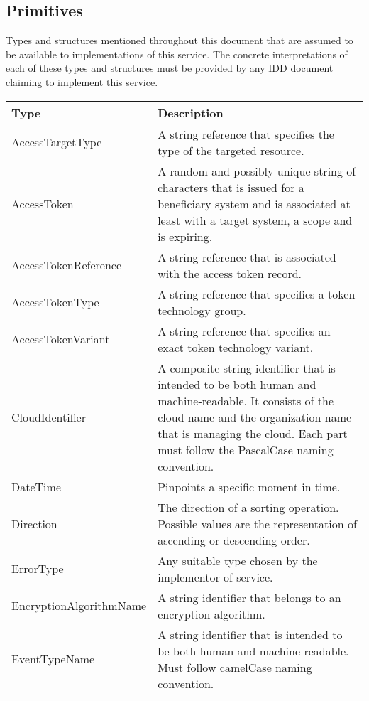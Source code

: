 \documentclass[a4paper]{arrowhead}
\newcommand{\pdef}[1]{{\textcolor{ArrowheadGrey}{#1\label{sec:model:primitives:#1}\label{sec:model:primitives:#1s}\label{sec:model:primitives:#1es}}}}
\begin{document}
\newpage

\subsection{Primitives}
\label{sec:model:primitives}

Types and structures mentioned throughout this document that are assumed to be available to implementations of this service.
The concrete interpretations of each of these types and structures must be provided by any IDD document claiming to implement this service.


\begin{table}[ht!]
\begin{tabularx}{\textwidth}{| p{5cm} | X |} \hline
\rowcolor{gray!33} Type & Description \\ \hline
\pdef{AccessTargetType} & A string reference that specifies the type of the targeted resource. \\ \hline
\pdef{AccessToken} & A random and possibly unique string of characters that is issued for a beneficiary system and is associated at least with a target system, a scope and is expiring.\\ \hline
\pdef{AccessTokenReference} & A string reference that is associated with the access token record. \\ \hline
\pdef{AccessTokenType} & A string reference that specifies a token technology group.\\ \hline
\pdef{AccessTokenVariant} & A string reference that specifies an exact token technology variant.\\ \hline
\pdef{CloudIdentifier} & A composite string identifier that is intended to be both human and machine-readable. It consists of the cloud name and the organization name that is managing the cloud. Each part must follow the PascalCase naming convention. \\ \hline
\pdef{DateTime}         & Pinpoints a specific moment in time. \\ \hline
\pdef{Direction}        & The direction of a sorting operation. Possible values are the representation of ascending or descending order. \\ \hline
\pdef{ErrorType}        & Any suitable type chosen by the implementor of service. \\ \hline
\pdef{EncryptionAlgorithmName} & A string identifier that belongs to an encryption algorithm. \\ \hline
\pdef{EventTypeName}      & A string identifier that is intended to be both human and machine-readable. Must follow camelCase naming convention. \\ \hline

\end{tabularx}
\end{table}
\end{document}
